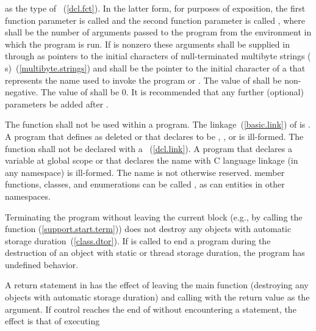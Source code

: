 %
%
as the type of ~(\ref{dcl.fct}).
%
%
In the latter form, for purposes of exposition, the first function
parameter is called  and the second function parameter is
called , where  shall be the number of
arguments passed to the program from the environment in which the
program is run. If
 is nonzero these arguments shall be supplied in
 through  as pointers to the initial
characters of null-terminated multibyte strings (\ntmbs
s)~(\ref{multibyte.strings}) and  shall be the pointer to
the initial character of a \ntmbs that represents the name used to
invoke the program or . The value of  shall be
non-negative. The value of  shall be 0. \enternote It
is recommended that any further (optional) parameters be added after
. \exitnote

\pnum
The function  shall not be used within
a program.
%
The linkage~(\ref{basic.link}) of  is
. A program that defines  as
deleted or that declares  to be
, , or  is ill-formed.
The  function shall not be declared with a
~(\ref{dcl.link}).  A program that
declares a variable  at global scope or that declares the name
 with C language linkage (in any namespace) is ill-formed.
The name  is
not otherwise reserved. \enterexample member functions, classes, and
enumerations can be called , as can entities in other
namespaces. \exitexample

\pnum
{}%
%
%
Terminating the program
without leaving the current block (e.g., by calling the function
 (\ref{support.start.term})) does not destroy any
objects with automatic storage duration~(\ref{class.dtor}). If
 is called to end a program during the destruction of
an object with static or thread storage duration, the program has undefined
behavior.

\pnum
{}%
%
A return statement in  has the effect of leaving the main
function (destroying any objects with automatic storage duration) and
calling  with the return value as the argument. If
control reaches the end of  without encountering a
 statement, the effect is that of executing

